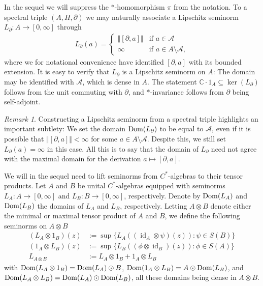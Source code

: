 \documentclass[11pt, a4paper, oneside, final, reqno]{amsart}
\newcommand{\calA}{\mathcal{A}}
\newcommand{\bbC}{\mathbb{C}}
\newcommand{\id}{\operatorname{id}}
\theoremstyle{definition}
\theoremstyle{plain}
\theoremstyle{remark}
\newtheorem{remark}[definition]{Remark}
\numberwithin{equation}{section}
\begin{document}
In the sequel we will suppress the $*$-homomorphism $\pi$ from the notation.
To a spectral triple $(A, H, \partial)$ we may naturally associate a Lipschitz seminorm $L_\partial \colon A\to [0,\infty]$ through
\begin{align}\label{eq:def-spec-triple-slip-norm}
    L_\partial (a) = \begin{cases}
        \Vert [\partial, a] \Vert & \text{if $a \in \calA$} \\
        \infty & \text{if $a \in A \setminus \calA$},
    \end{cases}
\end{align}
where we for notational convenience have identified $[\partial, a]$ with its bounded extension. It is easy to verify that $L_\partial$ is a Lipschitz seminorm on $A$: The domain may be identified with $\calA$, which is dense in $A$. The statement $\bbC \cdot 1_A \subseteq \ker(L_\partial)$ follows from the unit commuting with $\partial$, and $*$-invariance follows from $\partial$ being self-adjoint.

\begin{remark}\label{remark:extension-by-infty}
    Constructing a Lipschitz seminorm from a spectral triple highlights an important subtlety: We set the domain ${\rm Dom}(L_\partial)$ to be equal to $\calA$, even if it is possible that 
    $\Vert [\partial , a]\Vert < \infty$ for some $a \in A \setminus \calA$. Despite this, we still set $L_\partial (a) = \infty$ in this case. All this is to say that the domain of $L_\partial$ need not agree with the maximal domain for the derivation $a \mapsto [\partial, a]$.
\end{remark}

We will in the sequel need to lift
seminorms from $C^*$-algebras to their tensor products. Let $A$ and $B$ be unital $C^*$-algebras equipped with seminorms $L_A \colon A \to [0,\infty]$ and $L_B \colon B \to [0,\infty]$, respectively. Denote by ${\rm Dom}(L_A)$ and ${\rm Dom}(L_B)$ the domains of $L_A$ and $L_B$, respectively. Letting $A \otimes B$ denote either the minimal or maximal tensor product of $A$ and $B$, we define the following seminorms on $A \otimes B$
\begin{equation}\label{eq:def-tensor-seminorms}
\begin{split}
    (L_A \otimes 1_B) (z)
        &:= \sup\{ L_A((\id_A \otimes \psi)(z)) \colon \psi \in S(B) \} \\
        (1_A \otimes L_B) (z) &:= \sup\{ L_B((\phi \otimes \id_B)(z)) \colon \phi \in S(A) \}\\
        L_{A\otimes B} &:= L_A \otimes 1_B + 1_A \otimes L_B
    \end{split}
\end{equation}
with ${\rm Dom}(L_A \otimes 1_B) = {\rm Dom}(L_A) \odot B$, ${\rm Dom}(1_A \otimes L_B) = A \odot {\rm Dom}(L_B)$, and ${\rm Dom}(L_A \otimes L_B) = {\rm Dom}(L_A) \odot {\rm Dom}(L_B)$, all these domains being dense in $A \otimes B$.
\end{document}
